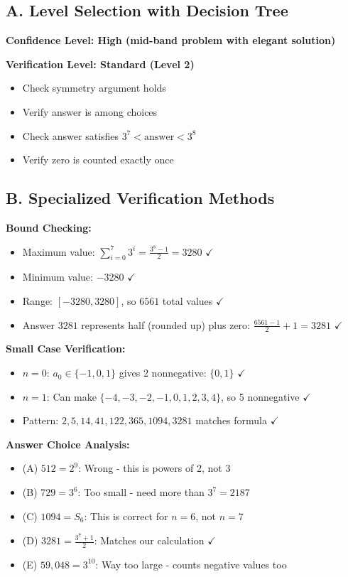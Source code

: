 \documentclass[12pt]{article}
\begin{document}
\begin{verificationbox}
\subsection*{A. Level Selection with Decision Tree}

\textbf{Confidence Level: High (mid-band problem with elegant solution)}

\textbf{Verification Level: Standard (Level 2)}
\begin{itemize}
    \item Check symmetry argument holds
    \item Verify answer is among choices
    \item Check answer satisfies $3^7 < \text{answer} < 3^8$
    \item Verify zero is counted exactly once
\end{itemize}

\subsection*{B. Specialized Verification Methods}

\textbf{Bound Checking:}
\begin{itemize}
    \item Maximum value: $\sum_{i=0}^{7} 3^i = \frac{3^8-1}{2} = 3280$ $\checkmark$
    \item Minimum value: $-3280$ $\checkmark$
    \item Range: $[-3280, 3280]$, so $6561$ total values $\checkmark$
    \item Answer $3281$ represents half (rounded up) plus zero: $\frac{6561-1}{2} + 1 = 3281$ $\checkmark$
\end{itemize}

\textbf{Small Case Verification:}
\begin{itemize}
    \item $n=0$: $a_0 \in \{-1,0,1\}$ gives 2 nonnegative: $\{0,1\}$ $\checkmark$
    \item $n=1$: Can make $\{-4,-3,-2,-1,0,1,2,3,4\}$, so 5 nonnegative $\checkmark$
    \item Pattern: $2, 5, 14, 41, 122, 365, 1094, 3281$ matches formula $\checkmark$
\end{itemize}

\textbf{Answer Choice Analysis:}
\begin{itemize}
    \item (A) $512 = 2^9$: Wrong - this is powers of 2, not 3
    \item (B) $729 = 3^6$: Too small - need more than $3^7 = 2187$
    \item (C) $1094 = S_6$: This is correct for $n=6$, not $n=7$
    \item (D) $3281 = \frac{3^8+1}{2}$: Matches our calculation $\checkmark$
    \item (E) $59,048 = 3^{10}$: Way too large - counts negative values too
\end{itemize}


\end{verificationbox}
\end{document}
